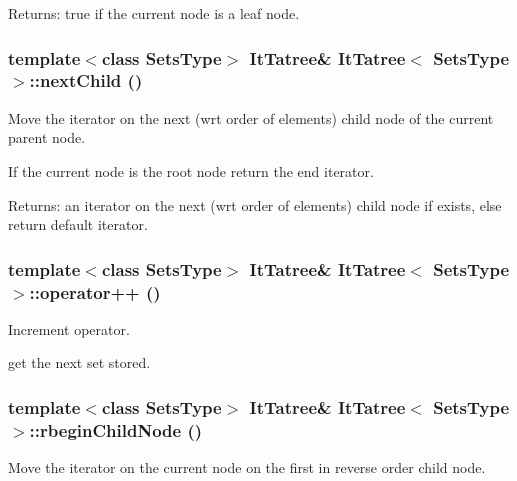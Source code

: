 \begin{Desc}
\item[Returns:]true if the current node is a leaf node. \end{Desc}
\subsubsection{\setlength{\rightskip}{0pt plus 5cm}template$<$class Sets\-Type$>$ {\bf It\-Tatree}\& {\bf It\-Tatree}$<$ Sets\-Type $>$::next\-Child ()\hspace{0.3cm}{\tt  [inline]}}\label{class_it_tatree_cd42f1e213c3f0007552f13c9bb28d66}


Move the iterator on the next (wrt order of elements) child node of the current parent node. 

If the current node is the root node return the end iterator. \begin{Desc}
\item[Returns:]an iterator on the next (wrt order of elements) child node if exists, else return default iterator. \end{Desc}
\subsubsection{\setlength{\rightskip}{0pt plus 5cm}template$<$class Sets\-Type$>$ {\bf It\-Tatree}\& {\bf It\-Tatree}$<$ Sets\-Type $>$::operator++ ()\hspace{0.3cm}{\tt  [inline]}}\label{class_it_tatree_a1fa514b4795ec9ca09a2022165450cc}


Increment operator. 

get the next set stored. 
\subsubsection{\setlength{\rightskip}{0pt plus 5cm}template$<$class Sets\-Type$>$ {\bf It\-Tatree}\& {\bf It\-Tatree}$<$ Sets\-Type $>$::rbegin\-Child\-Node ()\hspace{0.3cm}{\tt  [inline]}}\label{class_it_tatree_bebc704fc8f53625b05f3c4ac79fa376}


Move the iterator on the current node on the first in reverse order child node. 

